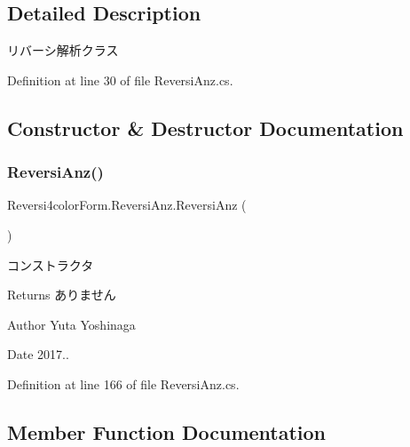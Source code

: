 \subsection{Detailed Description}
リバーシ解析クラス 

Definition at line 30 of file Reversi\+Anz.\+cs.



\subsection{Constructor \& Destructor Documentation}
\mbox{\label{class_reversi4color_form_1_1_reversi_anz_a7799887819857b6cba4d9f6048e4d43e}} 
\subsubsection{\texorpdfstring{Reversi\+Anz()}{ReversiAnz()}}
{\footnotesize\ttfamily Reversi4color\+Form.\+Reversi\+Anz.\+Reversi\+Anz (\begin{DoxyParamCaption}{ }\end{DoxyParamCaption})}



コンストラクタ 

\begin{DoxyReturn}{Returns}
ありません 
\end{DoxyReturn}
\begin{DoxyAuthor}{Author}
Yuta Yoshinaga 
\end{DoxyAuthor}
\begin{DoxyDate}{Date}
2017.. 
\end{DoxyDate}


Definition at line 166 of file Reversi\+Anz.\+cs.



\subsection{Member Function Documentation}
\mbox{\label{class_reversi4color_form_1_1_reversi_anz_af8f136030659c5737f9321efe7d06237}} 
